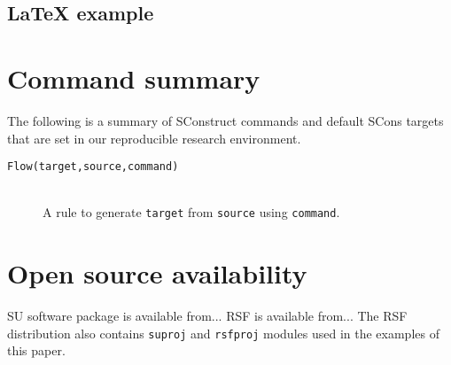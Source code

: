 \subsection{LaTeX example}

\section{Command summary}

The following is a summary of SConstruct commands and default SCons
targets that are set in our reproducible research environment.

\begin{description}
\item[\texttt{Flow(target,source,command)}] \dotfill \pageref{flow} \\
  A rule to generate \texttt{target} from \texttt{source} using
  \texttt{command}.
\end{description}

\section{Open source availability}

SU software package is available from... RSF is available from... The
RSF distribution also contains \texttt{suproj} and \texttt{rsfproj}
modules used in the examples of this paper.




